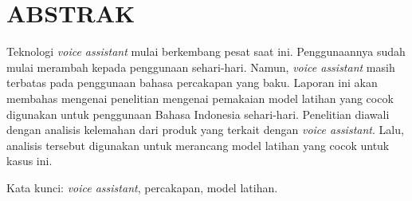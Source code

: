 \clearpage
\chapter*{ABSTRAK}

Teknologi \textit{voice assistant} mulai berkembang pesat saat ini. Penggunaannya sudah mulai merambah kepada penggunaan sehari-hari. Namun, \textit{voice assistant} masih terbatas pada penggunaan bahasa percakapan yang baku. Laporan ini akan membahas mengenai penelitian mengenai pemakaian model latihan yang cocok digunakan untuk penggunaan Bahasa Indonesia sehari-hari. Penelitian diawali dengan analisis kelemahan dari produk yang terkait dengan \textit{voice assistant}. Lalu, analisis tersebut digunakan untuk merancang model latihan yang cocok untuk kasus ini.

\vspace{15mm}
Kata kunci: \textit{voice assistant}, percakapan, model latihan.
\clearpage